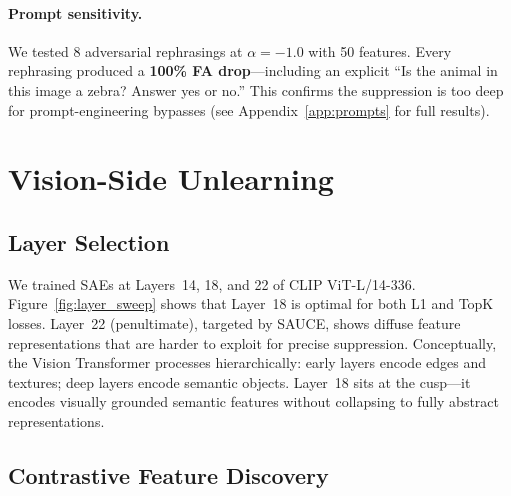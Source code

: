 \documentclass{article}
\begin{document}
\paragraph{Prompt sensitivity.}
We tested 8 adversarial rephrasings at $\alpha=-1.0$ with 50 features.
Every rephrasing produced a \textbf{100\% FA drop}---including an
explicit ``Is the animal in this image a zebra? Answer yes or no.''
This confirms the suppression is too deep for prompt-engineering bypasses
(see Appendix~\ref{app:prompts} for full results).

\section{Vision-Side Unlearning}
\label{sec:vision}

\subsection{Layer Selection}

We trained SAEs at Layers~14, 18, and 22 of CLIP ViT-L/14-336.
Figure~\ref{fig:layer_sweep} shows that Layer~18 is optimal for both
L1 and TopK losses. Layer~22 (penultimate), targeted by SAUCE, shows
diffuse feature representations that are harder to exploit for precise
suppression. Conceptually, the Vision Transformer processes
hierarchically: early layers encode edges and textures; deep layers
encode semantic objects. Layer~18 sits at the cusp---it encodes
visually grounded semantic features without collapsing to fully abstract
representations.

\subsection{Contrastive Feature Discovery}
\end{document}
